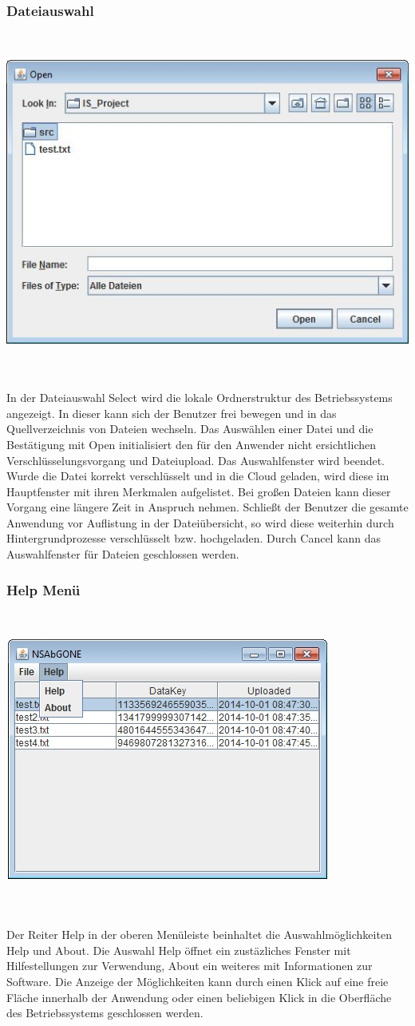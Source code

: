 \documentclass[13pt,a4paper,bibliography=totocnumbered,listof=totocnumbered]{scrartcl}
\begin{document}
\subsubsection{Dateiauswahl}
$\;$\\
\begin{minipage}{\linewidth}
	\centering
	\includegraphics[width=0.4\linewidth]{./img/Select.jpg}
	\label{Select}
\end{minipage}
\\\\In der Dateiauswahl Select wird die lokale Ordnerstruktur des Betriebssystems angezeigt. In dieser kann sich der Benutzer frei bewegen und in das Quellverzeichnis von Dateien wechseln. Das Auswählen einer Datei und die Bestätigung mit Open initialisiert den für den Anwender nicht ersichtlichen Verschlüsselungsvorgang und Dateiupload. Das Auswahlfenster wird beendet. Wurde die Datei korrekt verschlüsselt und in die Cloud geladen, wird diese im Hauptfenster mit ihren Merkmalen aufgelistet. Bei großen Dateien kann dieser Vorgang eine längere Zeit in Anspruch nehmen. Schließt der Benutzer die gesamte Anwendung vor Auflistung in der Dateiübersicht, so wird diese weiterhin durch Hintergrundprozesse verschlüsselt bzw. hochgeladen. Durch Cancel kann das Auswahlfenster für Dateien geschlossen werden.

\subsubsection{Help Menü}
$\;$\\
\begin{minipage}{\linewidth}
	\centering
	\includegraphics[width=0.4\linewidth]{./img/Help.jpg}
	\label{Help}
\end{minipage}
\\\\Der Reiter Help in der oberen Menüleiste beinhaltet die Auswahlmöglichkeiten Help und About. Die Auswahl Help öffnet ein zustäzliches Fenster mit Hilfestellungen zur Verwendung, About ein weiteres mit Informationen zur Software. Die Anzeige der Möglichkeiten kann durch einen Klick auf eine freie Fläche innerhalb der Anwendung oder einen beliebigen Klick in die Oberfläche des Betriebssystems geschlossen werden.
\end{document}
